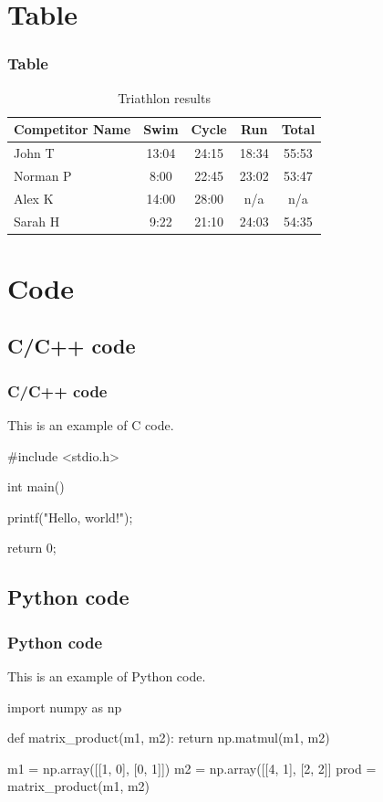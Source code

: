 \documentclass[aspectratio=169]{beamer}
\begin{document}
\section{Table}
\begin{frame}
\frametitle{Table}
\begin{table}
\begin{tabular}{l | c | c | c | c }
Competitor Name & Swim & Cycle & Run & Total \\
\hline
John T & 13:04 & 24:15 & 18:34 & 55:53 \\ 
Norman P & 8:00 & 22:45 & 23:02 & 53:47\\
Alex K & 14:00 & 28:00 & n/a & n/a\\
Sarah H & 9:22 & 21:10 & 24:03 & 54:35 
\end{tabular}
\caption{Triathlon results}
\end{table}

\end{frame}

\section{Code}
\subsection{C/C++ code}
\begin{frame}[fragile]
\frametitle{C/C++ code}

This is an example of C code.

\begin{cplusplus}
#include <stdio.h>

int main() {
    printf("Hello, world!\n");

    return 0;
}
\end{cplusplus}

\end{frame}

\subsection{Python code}
\begin{frame}[fragile]
\frametitle{Python code}

This is an example of Python code.
\begin{python}
import numpy as np


def matrix_product(m1, m2):
    return np.matmul(m1, m2)


m1 = np.array([[1, 0], [0, 1]])
m2 = np.array([[4, 1], [2, 2]]
prod = matrix_product(m1, m2)
\end{python}


\end{frame}
\end{document}
